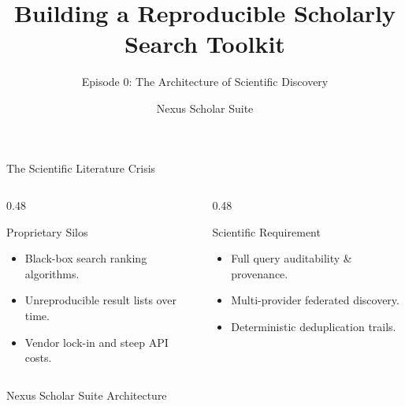 \documentclass[aspectratio=169]{beamer}
\title{Building a Reproducible Scholarly Search Toolkit}
\subtitle{Episode 0: The Architecture of Scientific Discovery}
\author{Nexus Scholar Suite}
\date{}
\begin{document}
\begin{frame}[plain]
  \titlepage
\end{frame}

\begin{frame}{The Scientific Literature Crisis}
  \begin{columns}[T]
    \begin{column}{0.48\textwidth}
      \begin{alertblock}{Proprietary Silos}
        \begin{itemize}
          \item Black-box search ranking algorithms.
          \item Unreproducible result lists over time.
          \item Vendor lock-in and steep API costs.
        \end{itemize}
      \end{alertblock}
    \end{column}
    \begin{column}{0.48\textwidth}
      \begin{block}{Scientific Requirement}
        \begin{itemize}
          \item Full query auditability \& provenance.
          \item Multi-provider federated discovery.
          \item Deterministic deduplication trails.
        \end{itemize}
      \end{block}
    \end{column}
  \end{columns}
\end{frame}

\begin{frame}{Nexus Scholar Suite Architecture}
  \begin{center}
  \end{center}
\end{frame}
\end{document}
